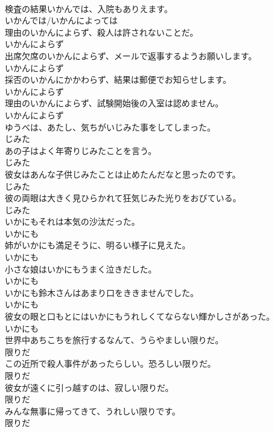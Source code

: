 \documentclass[8pt]{extreport}
\begin{document}
\begin{CJK}{UTF8}{min}
\\	検査の結果いかんでは、入院もありえます。	
\\	いかんでは/いかんによっては	
\\	理由のいかんによらず、殺人は許されないことだ。	
\\	いかんによらず	
\\	出席欠席のいかんによらず、メールで返事するようお願いします。	
\\	いかんによらず	
\\	採否のいかんにかかわらず、結果は郵便でお知らせします。	
\\	いかんによらず	
\\	理由のいかんによらず、試験開始後の入室は認めません。	
\\	いかんによらず	
\\	ゆうべは、あたし、気ちがいじみた事をしてしまった。	
\\	じみた	
\\	あの子はよく年寄りじみたことを言う。	
\\	じみた	
\\	彼女はあんな子供じみたことは止めたんだなと思ったのです。	
\\	じみた	
\\	彼の両眼は大きく見ひらかれて狂気じみた光りをおびている。	
\\	じみた	
\\	いかにもそれは本気の沙汰だった。	
\\	いかにも	
\\	姉がいかにも満足そうに、明るい様子に見えた。	
\\	いかにも	
\\	小さな娘はいかにもうまく泣きだした。	
\\	いかにも	
\\	いかにも鈴木さんはあまり口をききませんでした。	
\\	いかにも	
\\	彼女の眼と口もとにはいかにもうれしくてならない輝かしさがあった。	
\\	いかにも	
\\	世界中あちこちを旅行するなんて、うらやましい限りだ。	
\\	限りだ	
\\	この近所で殺人事件があったらしい。恐ろしい限りだ。	
\\	限りだ	
\\	彼女が遠くに引っ越すのは、寂しい限りだ。	
\\	限りだ	
\\	みんな無事に帰ってきて、うれしい限りです。	
\\	限りだ	

\end{CJK}
\end{document}
